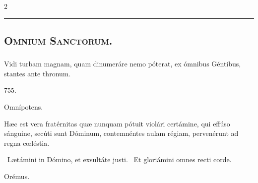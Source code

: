 \documentclass[9pt,twoside]{extarticle}
\begin{document}
\begin{multicols}{2}
\begin{tightlist}{}
\item {}
\end{tightlist}

\begin{center}\textcolor{red}{\rule{\linewidth}{0.5pt}} \end{center}

\subsection*{\center {}}
\subsubsection*{\center {}}
\subsection*{\center \textsc{Omnium Sanctorum.}}
\subsubsection*{\center {}}

\begin{tightlist}{}
\item {} Vidi turbam magnam, quam dinumeráre nemo póterat, ex ómnibus Géntibus, stantes ante thronum.
\item {}
\item {} 755.
\item {} Omnípotens.
\item {} Hæc est vera fratérnitas quæ nunquam pótuit violári certámine, qui effúso sánguine, secúti sunt Dóminum, contemnéntes aulam régiam, pervenérunt ad regna cœléstia.
\item {}~Lætámini in Dómino, et exsultáte justi. ~Et gloriámini omnes recti corde.
\item Orémus. \hfill {}
\end{tightlist}


\end{multicols}
\end{document}
